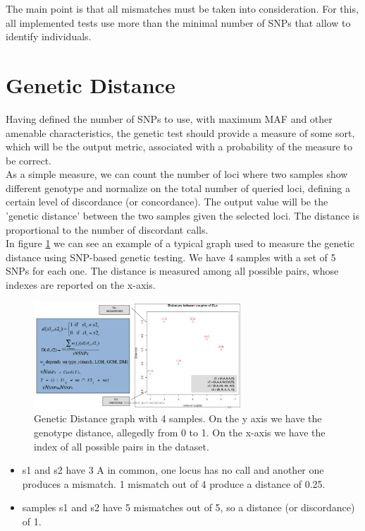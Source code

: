 The main point is that all mismatches must be taken into consideration.
For this, all implemented tests use more than the minimal number of SNPs that allow to identify individuals.

\section{Genetic Distance}
Having defined the number of SNPs to use, with maximum MAF and other amenable characteristics, the genetic test should provide a measure of some sort, which will be the output metric, associated with a probability of the measure to be correct.
\\
As a simple measure, we can count the number of loci where two samples show different genotype and normalize on the total number of queried loci, defining a certain level of discordance (or concordance). The output value will be the 'genetic distance' between the two samples given the selected loci. The distance is proportional to the number of discordant calls.
\\
In figure \ref{fig:Distance} we can see an example of a typical graph used to measure the genetic distance using SNP-based genetic testing. We have 4 samples with a set of 5 SNPs for each one. The distance is measured among all possible pairs, whose indexes are reported on the x-axis.

\begin{figure}[H]
	\centering
	\includegraphics[width=0.7\textwidth]{loci.PNG}
	\caption{Genetic Distance graph with 4 samples. On the y axis we have the genotype distance, allegedly from 0 to 1. On the x-axis we have the index of all possible pairs in the dataset.}
	\label{fig:Distance}
\end{figure}


\begin{itemize}
	\item s1 and s2 have 3 A in common, one locus has no call and another one produces a mismatch. 1 mismatch out of 4 produce a distance of 0.25.
	\item samples s1 and s2 have 5 mismatches out of 5, so a distance (or discordance) of 1.
\end{itemize}



